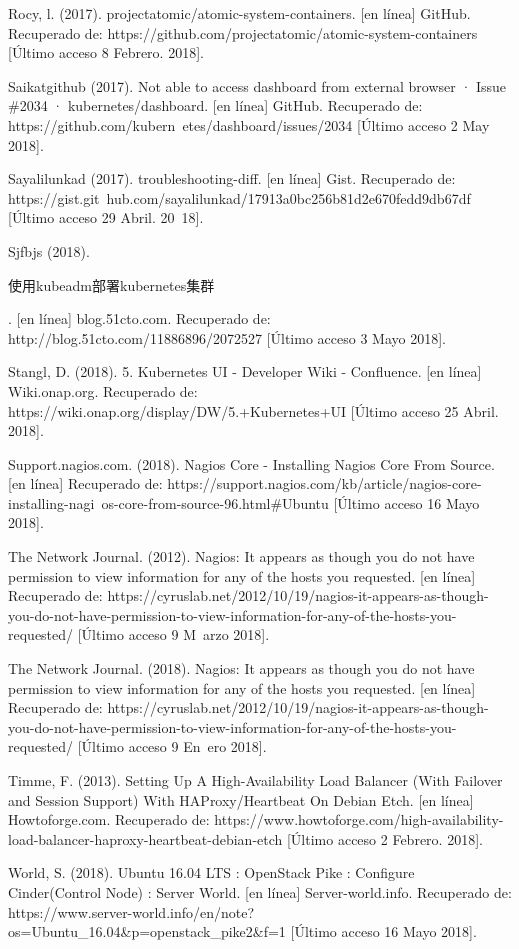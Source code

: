 Rocy, l. (2017). projectatomic/atomic-system-containers. [en línea] GitHub. Recuperado de: https://github.com/projectatomic/atomic-system-containers [Último acceso 8 Febrero. 2018].

Saikatgithub (2017). Not able to access dashboard from external browser · Issue \#2034 · kubernetes/dashboard. [en línea] GitHub. Recuperado de: https://github.com/kubern\ etes/dashboard/issues/2034 [Último acceso 2 May 2018].

Sayalilunkad (2017). troubleshooting-diff. [en línea] Gist. Recuperado de: https://gist.git\ hub.com/sayalilunkad/17913a0bc256b81d2e670fedd9db67df [Último acceso 29 Abril. 20\ 18].

Sjfbjs (2018). \begin{CJK*}{UTF8}{gbsn}使用kubeadm部署kubernetes集群\end{CJK*}. [en línea] blog.51cto.com. Recuperado de: http://blog.51cto.com/11886896/2072527 [Último acceso 3 Mayo 2018].

Stangl, D. (2018). 5. Kubernetes UI - Developer Wiki - Confluence. [en línea] Wiki.onap.org. Recuperado de: https://wiki.onap.org/display/DW/5.+Kubernetes+UI [Último acceso 25 Abril. 2018].


Support.nagios.com. (2018). Nagios Core - Installing Nagios Core From Source. [en línea] Recuperado de: https://support.nagios.com/kb/article/nagios-core-installing-nagi\ os-core-from-source-96.html\#Ubuntu [Último acceso 16 Mayo 2018].

The Network Journal. (2012). Nagios: It appears as though you do not have permission to view information for any of the hosts you requested. [en línea] Recuperado de: https://cyruslab.net/2012/10/19/nagios-it-appears-as-though-you-do-not-have-permission-to-view-information-for-any-of-the-hosts-you-requested/ [Último acceso 9 M\ arzo 2018].

The Network Journal. (2018). Nagios: It appears as though you do not have permission to view information for any of the hosts you requested. [en línea] Recuperado de: https://cyruslab.net/2012/10/19/nagios-it-appears-as-though-you-do-not-have-permission-to-view-information-for-any-of-the-hosts-you-requested/ [Último acceso 9 En\ ero 2018].

Timme, F. (2013). Setting Up A High-Availability Load Balancer (With Failover and Session Support) With HAProxy/Heartbeat On Debian Etch. [en línea] Howtoforge.com. Recuperado de: https://www.howtoforge.com/high-availability-load-balancer-haproxy-heartbeat-debian-etch [Último acceso 2 Febrero. 2018].

World, S. (2018). Ubuntu 16.04 LTS : OpenStack Pike : Configure Cinder(Control Node) : Server World. [en línea] Server-world.info. Recuperado de: https://www.server-world.info/en/note?os=Ubuntu\_16.04\&p=openstack\_pike2\&f=1 [Último acceso 16 Mayo 2018].











    
    


